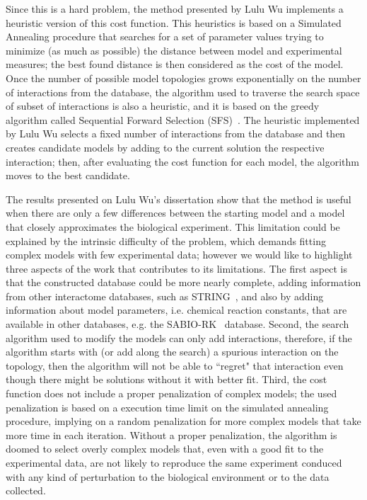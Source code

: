 Since this is a hard problem, the method presented by Lulu Wu 
implements a heuristic version of this cost function. This heuristics 
is based on a Simulated Annealing procedure that searches for a set of 
parameter values trying to minimize (as much as possible) the distance 
between model and experimental measures; the best found distance is then
considered as the cost of the model. Once the number of possible model 
topologies grows exponentially on the number of interactions from the 
database, the algorithm used to traverse the search space of subset of 
interactions is also a heuristic, and it is based on the greedy 
algorithm called Sequential Forward Selection (SFS)~\cite{Whitney1971}.
The heuristic implemented by Lulu Wu selects a fixed number of 
interactions from the database and then creates candidate models by 
adding to the current solution the respective interaction; then, after 
evaluating the cost function for each model, the algorithm moves to the 
best candidate.

The results presented on Lulu Wu's dissertation show that the method is 
useful when there are only a few differences between the starting model
and a model that closely approximates the biological experiment. This
limitation could be explained by the intrinsic difficulty of the 
problem, which demands fitting complex models with few experimental 
data; however we would like to highlight three aspects of the work that 
contributes to its limitations. The first aspect is that the constructed 
database could be more nearly complete, adding information from other 
interactome databases, such as STRING~\cite{Szklarczyk2010}, and also by 
adding information about model parameters, i.e. chemical reaction 
constants, that are available in other databases, e.g. the 
SABIO-RK~\cite{Wittig2011} database. Second, the search algorithm used
to modify the models can only add interactions, therefore, if the 
algorithm starts with (or add along the search) a spurious interaction 
on the topology, then the algorithm will not be able to ``regret" that 
interaction even though there might be solutions without it with better
fit. Third, the cost function does not include a proper penalization of
complex models; the used penalization is based on a execution time limit
on the simulated annealing procedure, implying on a random 
penalization for more complex models that take more time in each 
iteration. Without a proper penalization, the algorithm is doomed to 
select overly complex models that, even with a good fit to the 
experimental data, are not likely to reproduce the same experiment
conduced with any kind of perturbation to the biological environment or 
to the data collected.

